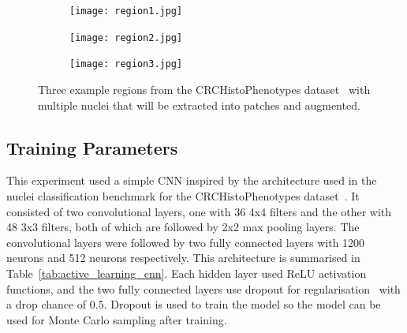 \begin{figure}[t!]
	\centering
	\begin{subfigure}{0.3\textwidth}
		\texttt{[image: region1.jpg]}
	\end{subfigure}
	\begin{subfigure}{0.3\textwidth}
		\texttt{[image: region2.jpg]}
	\end{subfigure}
	\begin{subfigure}{0.3\textwidth}
		\texttt{[image: region3.jpg]}
	\end{subfigure}
	\caption{Three example regions from the CRCHistoPhenotypes dataset~\cite{sirinukunwattana2016locality} with multiple nuclei that will be extracted into patches and augmented.}
	\label{fig:region_example}
\end{figure}

\subsection{Training Parameters}
This experiment used a simple CNN inspired by the architecture used in the nuclei classification benchmark for the CRCHistoPhenotypes dataset~\citep{sirinukunwattana2016locality}. It consisted of two convolutional layers, one with 36 4x4 filters and the other with 48 3x3 filters, both of which are followed by 2x2 max pooling layers. The convolutional layers were followed by two fully connected layers with 1200 neurons and 512 neurons respectively. This architecture is summarised in Table~\ref{tab:active_learning_cnn}. Each hidden layer used ReLU activation functions, and the two fully connected layers use dropout for regularisation~\citep{srivastava2014dropout} with a drop chance of 0.5. Dropout is used to train the model so the model can be used for Monte Carlo sampling after training.


